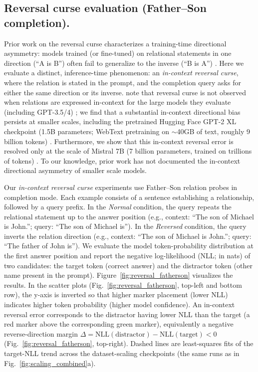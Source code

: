 \documentclass{article}
\begin{document}
\subsection{Reversal curse evaluation (Father--Son completion).}
\label{sec:results-reversal}

Prior work on the reversal curse characterizes a training-time directional asymmetry: models trained (or fine-tuned) on relational statements in one direction (``A is B'') often fail to generalize to the inverse (``B is A'') \citep{berglund2024reversal,lin2024delving}.
Here we evaluate a distinct, inference-time phenomenon: an \emph{in-context reversal curse}, where the relation is stated in the prompt, and the completion query asks for either the same direction or its inverse.
\citet{berglund2024reversal} note that reversal curse is not observed when relations are expressed in-context for the large models they evaluate (including GPT-3.5/4) \citep{openai2023gpt4}; we find that a substantial in-context directional bias persists at smaller scales, including the pretrained Hugging Face GPT-2 XL checkpoint (1.5B parameters; WebText pretraining on $\sim$40GB of text, roughly 9 billion tokens) \citep{hf_gpt2xl}. Furthermore, we show that this in-context reversal error is resolved only at the scale of Mistral 7B (7 billion parameters, trained on trillions of tokens) \citep{jiang2023mistral7b}.
To our knowledge, prior work has not documented the in-context directional asymmetry of smaller scale models.



Our \emph{in-context reversal curse} experiments use Father--Son relation probes in completion mode.
Each example consists of a sentence establishing a relationship, followed by a query prefix.
In the \emph{Normal} condition, the query repeats the relational statement up to the answer position (e.g., context: ``The son of Michael is John.''; query: ``The son of Michael is'').
In the \emph{Reversed} condition, the query inverts the relation direction (e.g., context: ``The son of Michael is John.''; query: ``The father of John is''). We evaluate the model token-probability distribution at the first answer position and report the negative log-likelihood (NLL; in nats) of two candidates: the target token (correct answer) and the distractor token (other name present in the prompt).
Figure~\ref{fig:reversal_fatherson} visualizes the results.
In the scatter plots (Fig.~\ref{fig:reversal_fatherson}, top-left and bottom row), the y-axis is inverted so that higher marker placement (lower NLL) indicates higher token probability (higher model confidence).
An in-context reversal error corresponds to the distractor having lower NLL than the target (a red marker above the corresponding green marker), equivalently a negative reverse-direction margin $\Delta=\mathrm{NLL}(\text{distractor})-\mathrm{NLL}(\text{target})<0$ (Fig.~\ref{fig:reversal_fatherson}, top-right).
Dashed lines are least-squares fits of the target-NLL trend across the dataset-scaling checkpoints (the same runs as in Fig.~\ref{fig:scaling_combined}a).
\end{document}
